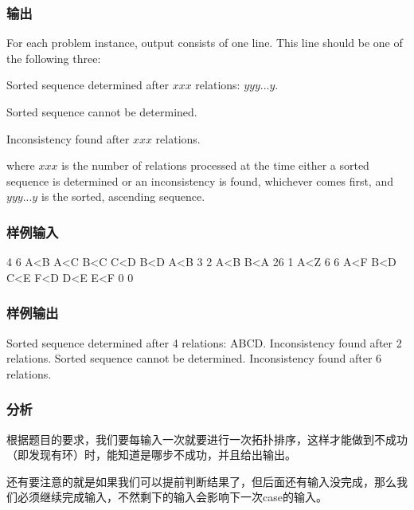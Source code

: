 \subsubsection{输出}
For each problem instance, output consists of one line. This line should be one of the following three: 

Sorted sequence determined after $xxx$ relations: $yyy...y$.

Sorted sequence cannot be determined. 

Inconsistency found after $xxx$ relations.

where $xxx$ is the number of relations processed at the time either a sorted sequence is determined or an inconsistency is found, whichever comes first, and $yyy...y$ is the sorted, ascending sequence.

\subsubsection{样例输入}
\begin{Code}
4 6
A<B
A<C
B<C
C<D
B<D
A<B
3 2
A<B
B<A
26 1
A<Z
6 6
A<F
B<D
C<E
F<D
D<E
E<F
0 0
\end{Code}

\subsubsection{样例输出}
\begin{Code}
Sorted sequence determined after 4 relations: ABCD.
Inconsistency found after 2 relations.
Sorted sequence cannot be determined.
Inconsistency found after 6 relations.
\end{Code}

\subsubsection{分析}
根据题目的要求，我们要每输入一次就要进行一次拓扑排序，这样才能做到不成功（即发现有环）时，能知道是哪步不成功，并且给出输出。

还有要注意的就是如果我们可以提前判断结果了，但后面还有输入没完成，那么我们必须继续完成输入，不然剩下的输入会影响下一次case的输入。

